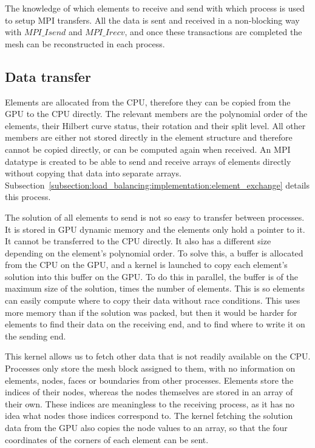 The knowledge of which elements to receive and send with which process is used to setup MPI
transfers. All the data is sent and received in a non-blocking way with $MPI\_Isend$ and
$MPI\_Irecv$, and once these transactions are completed the mesh can be reconstructed in each
process.

\subsection{Data transfer} \label{subsection:load_balancing:reconstruction:data_transfer}

Elements are allocated from the CPU, therefore they can be copied from the GPU to the CPU directly.
The relevant members are the polynomial order of the elements, their Hilbert curve status, their
rotation and their split level. All other members are either not stored directly in the element
structure and therefore cannot be copied directly, or can be computed again when received. An MPI
datatype is created to be able to send and receive arrays of elements directly without copying that
data into separate arrays.
Subsection~\ref{subsection:load_balancing:implementation:element_exchange} details this process.

The solution of all elements to send is not so easy to transfer between processes. It is stored in
GPU dynamic memory and the elements only hold a pointer to it. It cannot be transferred to the CPU
directly. It also has a different size depending on the element's polynomial order. To solve this, a
buffer is allocated from the CPU on the GPU, and a kernel is launched to copy each element's
solution into this buffer on the GPU. To do this in parallel, the buffer is of the maximum size of
the solution, times the number of elements. This is so elements can easily compute where to copy
their data without race conditions. This uses more memory than if the solution was packed, but then
it would be harder for elements to find their data on the receiving end, and to find where to write
it on the sending end. 

This kernel allows us to fetch other data that is not readily available on the CPU. Processes only
store the mesh block assigned to them, with no information on elements, nodes, faces or boundaries
from other processes. Elements store the indices of their nodes, whereas the nodes themselves are
stored in an array of their own. These indices are meaningless to the receiving process, as it has
no idea what nodes those indices correspond to. The kernel fetching the solution data from the GPU
also copies the node values to an array, so that the four coordinates of the corners of each element
can be sent.

